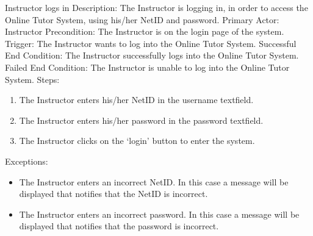 	
    \begin{section}{Instructor logs in}
		Description: The Instructor is logging in, in order to access the Online Tutor System, using his/her NetID and password. \newline
		Primary Actor: Instructor \newline
		Precondition: The Instructor is on the login page of the system. \newline
		Trigger: The Instructor wants to log into the Online Tutor System. \newline
		Successful End Condition: The Instructor successfully logs into the Online Tutor System. \newline
		Failed End Condition: The Instructor is unable to log into the Online Tutor System. \newline
        \newline
        Steps:
        \begin{enumerate}
            \item{The Instructor enters his/her NetID in the username textfield.}
            \item{The Instructor enters his/her password in the password textfield.}
            \item{The Instructor clicks on the ‘login’ button to enter the system.}
        \end{enumerate}
        Exceptions:
        \begin{itemize}
            \item{The Instructor enters an incorrect NetID. In this case a message will be displayed that notifies that the NetID is incorrect.}
			\item{The Instructor enters an incorrect password. In this case a message will be displayed that notifies that the password is incorrect.}
        \end{itemize}
    \end{section}	
	
